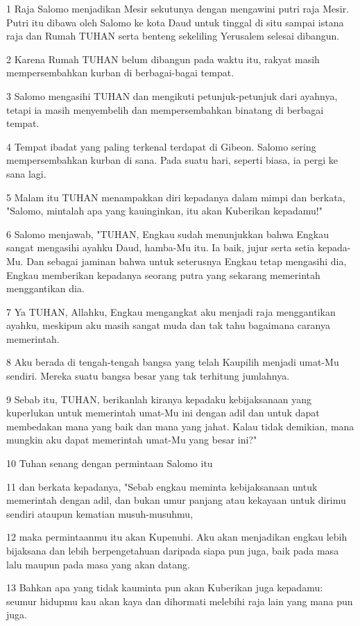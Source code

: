 \par 1 Raja Salomo menjadikan Mesir sekutunya dengan mengawini putri raja Mesir. Putri itu dibawa oleh Salomo ke kota Daud untuk tinggal di situ sampai istana raja dan Rumah TUHAN serta benteng sekeliling Yerusalem selesai dibangun.
\par 2 Karena Rumah TUHAN belum dibangun pada waktu itu, rakyat masih mempersembahkan kurban di berbagai-bagai tempat.
\par 3 Salomo mengasihi TUHAN dan mengikuti petunjuk-petunjuk dari ayahnya, tetapi ia masih menyembelih dan mempersembahkan binatang di berbagai tempat.
\par 4 Tempat ibadat yang paling terkenal terdapat di Gibeon. Salomo sering mempersembahkan kurban di sana. Pada suatu hari, seperti biasa, ia pergi ke sana lagi.
\par 5 Malam itu TUHAN menampakkan diri kepadanya dalam mimpi dan berkata, "Salomo, mintalah apa yang kauinginkan, itu akan Kuberikan kepadamu!"
\par 6 Salomo menjawab, "TUHAN, Engkau sudah menunjukkan bahwa Engkau sangat mengasihi ayahku Daud, hamba-Mu itu. Ia baik, jujur serta setia kepada-Mu. Dan sebagai jaminan bahwa untuk seterusnya Engkau tetap mengasihi dia, Engkau memberikan kepadanya seorang putra yang sekarang memerintah menggantikan dia.
\par 7 Ya TUHAN, Allahku, Engkau mengangkat aku menjadi raja menggantikan ayahku, meskipun aku masih sangat muda dan tak tahu bagaimana caranya memerintah.
\par 8 Aku berada di tengah-tengah bangsa yang telah Kaupilih menjadi umat-Mu sendiri. Mereka suatu bangsa besar yang tak terhitung jumlahnya.
\par 9 Sebab itu, TUHAN, berikanlah kiranya kepadaku kebijaksanaan yang kuperlukan untuk memerintah umat-Mu ini dengan adil dan untuk dapat membedakan mana yang baik dan mana yang jahat. Kalau tidak demikian, mana mungkin aku dapat memerintah umat-Mu yang besar ini?"
\par 10 Tuhan senang dengan permintaan Salomo itu
\par 11 dan berkata kepadanya, "Sebab engkau meminta kebijaksanaan untuk memerintah dengan adil, dan bukan umur panjang atau kekayaan untuk dirimu sendiri ataupun kematian musuh-musuhmu,
\par 12 maka permintaanmu itu akan Kupenuhi. Aku akan menjadikan engkau lebih bijaksana dan lebih berpengetahuan daripada siapa pun juga, baik pada masa lalu maupun pada masa yang akan datang.
\par 13 Bahkan apa yang tidak kauminta pun akan Kuberikan juga kepadamu: seumur hidupmu kau akan kaya dan dihormati melebihi raja lain yang mana pun juga.
